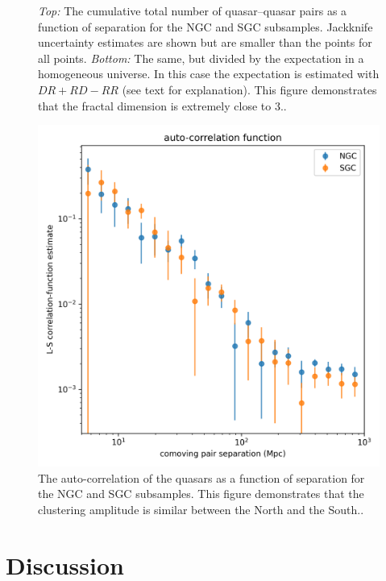 \documentclass[modern]{aastex631}
\newlength{\figurewidth}
\begin{document}
\begin{figure}[t!]
\begin{mdframed}
\begin{center}
  \end{center}
    \caption{\textsl{Top:} The cumulative total number of quasar--quasar pairs as a function of separation for the NGC and SGC subsamples. Jackknife uncertainty estimates are shown but are smaller than the points for all points.
    \textsl{Bottom:} The same, but divided by the expectation in a homogeneous universe.
    In this case the expectation is estimated with $DR + RD - RR$ (see text for explanation).
    This figure demonstrates that the fractal dimension is extremely close to 3.\label{fig:cumulative}.}
  \end{mdframed}
\end{figure}

\begin{figure}[t!]
  \begin{mdframed}
  \color{captiongray}
  \begin{center}
    \includegraphics[width=\figurewidth]{notebooks/corrfunc.png}
  \end{center}
    \caption{The auto-correlation of the quasars as a function of separation for the NGC and SGC subsamples.
    This figure demonstrates that the clustering amplitude is similar between the North and the South.\label{fig:corrfunc}.}
  \end{mdframed}
\end{figure}

\section{Discussion}
\end{document}
